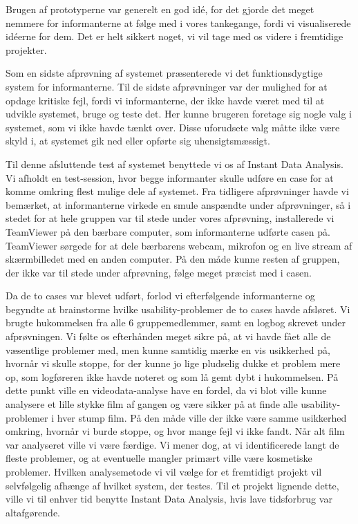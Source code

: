Brugen af prototyperne var generelt en god idé, for det gjorde det meget nemmere for informanterne at følge med i vores tankegange, fordi vi visualiserede idéerne for dem. Det er helt sikkert noget, vi vil tage med os videre i fremtidige projekter.

Som en sidste afprøvning af systemet præsenterede vi det funktionsdygtige system for informanterne. 
Til de sidste afprøvninger var der mulighed for at opdage kritiske fejl, fordi vi informanterne, der ikke havde været med til at udvikle systemet, bruge og teste det. Her kunne brugeren foretage sig nogle valg i systemet, som vi ikke havde tænkt over. Disse uforudsete valg måtte ikke være skyld i, at systemet gik ned eller opførte sig uhensigtsmæssigt.

Til denne afsluttende test af systemet benyttede vi os af Instant Data Analysis. Vi afholdt en test-session, hvor begge informanter skulle udføre en case for at komme omkring flest mulige dele af systemet. Fra tidligere afprøvninger havde vi bemærket, at informanterne virkede en smule anspændte under afprøvninger, så i stedet for at hele gruppen var til stede under vores afprøvning, installerede vi TeamViewer på den bærbare computer, som informanterne udførte casen på. TeamViewer sørgede for at dele bærbarens webcam, mikrofon og en live stream af skærmbilledet med en anden computer. På den måde kunne resten af gruppen, der ikke var til stede under afprøvning, følge meget præcist med i casen.

Da de to cases var blevet udført, forlod vi efterfølgende informanterne og begyndte at brainstorme hvilke usability-problemer de to cases havde afsløret. Vi brugte hukommelsen fra alle 6 gruppemedlemmer, samt en logbog skrevet under afprøvningen. Vi følte os efterhånden meget sikre på, at vi havde fået alle de væsentlige problemer med, men kunne samtidig mærke en vis usikkerhed på, hvornår vi skulle stoppe, for der kunne jo lige pludselig dukke et problem mere op, som logføreren ikke havde noteret og som lå gemt dybt i hukommelsen. På dette punkt ville en videodata-analyse have en fordel, da vi blot ville kunne analysere et lille stykke film af gangen og være sikker på at finde alle usability-problemer i hver stump film. På den måde ville der ikke være samme usikkerhed omkring, hvornår vi burde stoppe, og hvor mange fejl vi ikke fandt. Når alt film var analyseret ville vi være færdige. Vi mener dog, at vi identificerede langt de fleste problemer, og at eventuelle mangler primært ville være kosmetiske problemer. Hvilken analysemetode vi vil vælge for et fremtidigt projekt vil selvfølgelig afhænge af hvilket system, der testes. Til et projekt lignende dette, ville vi til enhver tid benytte Instant Data Analysis, hvis lave tidsforbrug var altafgørende.

